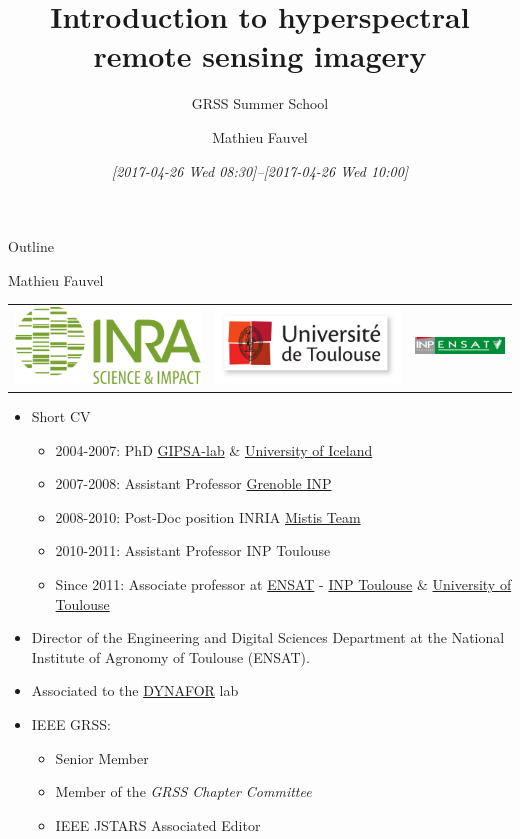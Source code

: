 \documentclass[10pt,aspectratio=1610]{beamer}
\author{Mathieu Fauvel}
\date{\textit{[2017-04-26 Wed 08:30]--[2017-04-26 Wed 10:00]}}
\title{Introduction to hyperspectral remote sensing imagery}
\subtitle{GRSS Summer School}
\institute{UMR Dynafor}
\begin{document}
\maketitle
\begin{frame}{Outline}
\tableofcontents
\end{frame}

\begin{frame}[label={sec:org5ad7d50}]{Mathieu Fauvel}
\begin{center}
\begin{tabular}{ccc}
  \includegraphics[width=0.3\linewidth]{figures/logo-INRA-transp.png}
  &\includegraphics[width=0.3\linewidth]{figures/logoUT.pdf}
  &\includegraphics[width=0.3\linewidth]{figures/inp-ensat.jpg}
\end{tabular}
\end{center}
\begin{itemize}
\item Short CV
\begin{itemize}
\item 2004-2007: PhD \href{http://www.gipsa-lab.grenoble-inp.fr/}{GIPSA-lab} \& \href{http://english.hi.is/}{University of Iceland}
\item 2007-2008: Assistant Professor \href{http://www.grenoble-inp.fr/}{Grenoble INP}
\item 2008-2010: Post-Doc position INRIA \href{https://mistis.inrialpes.fr/index\_en.html}{Mistis Team}
\item 2010-2011: Assistant Professor INP Toulouse
\item Since 2011: Associate professor at  \href{http://ensat.fr/}{ENSAT} - \href{http://inp-toulouse.fr/}{INP Toulouse} \& \href{http://www.univ-toulouse.fr/}{University of Toulouse}
\end{itemize}
\item Director of the Engineering and Digital Sciences Department at the National Institute of Agronomy of Toulouse (ENSAT).
\item Associated to the \href{http://dynafor.toulouse.inra.fr/}{DYNAFOR} lab
\item IEEE GRSS:
\begin{itemize}
\item Senior Member
\item Member of the \emph{GRSS Chapter Committee}
\item IEEE JSTARS Associated Editor
\end{itemize}
\end{itemize}
\end{frame}
\end{document}
